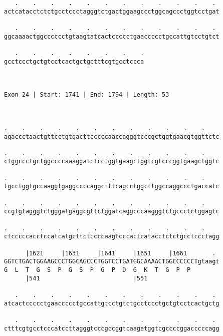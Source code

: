 \documentclass{article}
\begin{document}
\begin{Verbatim}
   .    .    .    .    .    .    .    .    .    .    .    . 
actcatacctctctgcctccctagggtctgactggaagccctggcagccctggtcctgat
                                                            
   .    .    .    .    .    .    .    .    .    .    .    . 
ggcaaaactggcccccctgtaagtatcactccccctgaaccccctgccattgtcctgtct
                                                            
   .    .    .    .    .    .    .    .
gcctccctgctgtcctcactgctgctttcgtgcctccca
                                       
                                       
 
Exon 24 | Start: 1741 | End: 1794 | Length: 53



.    .    .    .    .    .    .    .    .    .    .    .    
agaccctaactgttcctgtgacttcccccaaccagggtcccgctggtgaacgtggttctc
                                                            
.    .    .    .    .    .    .    .    .    .    .    .    
ctggccctgctggccccaaaggatctcctggtgaagctggtcgtcccggtgaagctggtc
                                                            
.    .    .    .    .    .    .    .    .    .    .    .    
tgcctggtgccaaggtgaggccccaggctttcagcctggcttggccaggccctgaccatc
                                                            
.    .    .    .    .    .    .    .    .    .    .    .    
ccgtgtagggtctgggatgaggcgttctggatcaggcccaagggtctgccctctggagtc
                                                            
.    .    .    .    .    .    .    .    .    .    .    .    
ctcccccacctccatcatgcttctccccaagtcccactcatacctctctgcctccctagg
                                                            
      |1621     |1631     |1641     |1651     |1661       . 
GGTCTGACTGGAAGCCCTGGCAGCCCTGGTCCTGATGGCAAAACTGGCCCCCCTgtaagt
G  L  T  G  S  P  G  S  P  G  P  D  G  K  T  G  P  P        
      |541                          |551                    
  
   .    .    .    .    .    .    .    .    .    .    .    . 
atcactccccctgaaccccctgccattgtcctgtctgcctccctgctgtcctcactgctg
                                                            
   .    .    .    .    .    .    .    .    .    .    .    . 
ctttcgtgcctcccatccttagggtcccgccggtcaagatggtcgccccggacccccagg
                                                            

\end{Verbatim}
\end{document}

